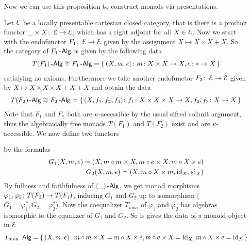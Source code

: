 \documentclass[a4paper,11pt,oneside,openany]{scrbook}
\begin{document}
Now we can use this proposition to construct monads via presentations. 

\begin{exmp}
   Let $\operatorname{\mathcal{E}}$ be a locally presentable cartesian closed category, that is there is a product functor $\_ \times X \colon \operatorname{\mathcal{E}} \to \operatorname{\mathcal{E}}$, which has a right adjoint for 
   all $X \in \operatorname{\mathcal{E}}$. Now we start with the endofunctor $F_{1} \colon \operatorname{\mathcal{E}} \to \operatorname{\mathcal{E}}$ given by the assignment $X \mapsto X \times X + X$. So the category of 
   $F_{1}\operatorname{-\mathsf{Alg}}$ is given by the following data
      \begin{equation*}
         T(F_{1})\operatorname{-\mathsf{Alg}} \cong F_{1}\operatorname{-\mathsf{Alg}} = \left\lbrace\,(X,m,e)\colon m\colon X \times X \to X,e \colon \ast \to X  \,\right\rbrace
      \end{equation*}
   satisfying no axioms. Furthermore we take another endofunctor $F_{2} \colon \operatorname{\mathcal{E}} \to \operatorname{\mathcal{E}}$ given by $X \mapsto X \times X \times X + X + X$ and obtain the data 
      \begin{equation*}
         T(F_{2})\operatorname{-\mathsf{Alg}} \cong F_{2}\operatorname{-\mathsf{Alg}} = \left\lbrace\,(X,f_{1},f_{2},f_{3})\colon f_{1}\colon X \times X \times X \to X, f_{2},f_{3} \colon X \to X \,\right\rbrace
      \end{equation*}
   Note that $F_{1}$ and $F_{2}$ both are $\kappa$-accessible by the usual sifted colimit argument, thus the algebraically free monads $T(F_{1})$ and 
   $T(F_{2})$ exist and are $\kappa$-accessible. We now define two functors 
      \begin{center}
      \end{center}
   by the formulas
      \begin{align*}
         G_{1}(X,m,e) = (X, m \circ m \times X, m \circ e \times X, m \circ X \times e) \\
         G_{2}(X,m,e) = (X, m \circ X \times m, \operatorname{id}_{X}, \operatorname{id}_{X})
      \end{align*}
   By fullness and faithfulness of $(\_)\operatorname{-\mathsf{Alg}}$, we get monad morphisms $\varphi_{1},\varphi_{2} \colon T(F_{2}) \to T(F_{1})$, inducing $G_{1}$ and $G_{2}$ up to
   isomorphism ($G_{1} = \varphi_{1}^{\ast},G_{2} = \varphi_{2}^{\ast}$). Now the coequalizer $T_{mon}$ of $\varphi_{1}$ and $\varphi_{2}$ has algebras 
   isomorphic to the equalizer of $G_{1}$ and $G_{2}$. So is gives the data of a monoid object in $\operatorname{\mathcal{E}}$
      \begin{equation*}
         T_{mon}\operatorname{-\mathsf{Alg}} = \left\lbrace\,(X,m,e)\colon m \circ m \times X = m \circ X \times e, m \circ e \times X = \operatorname{id}_{X}, m \circ X \times e = \operatorname{id}_{X} \,\right\rbrace
      \end{equation*}
\end{exmp}
\end{document}

